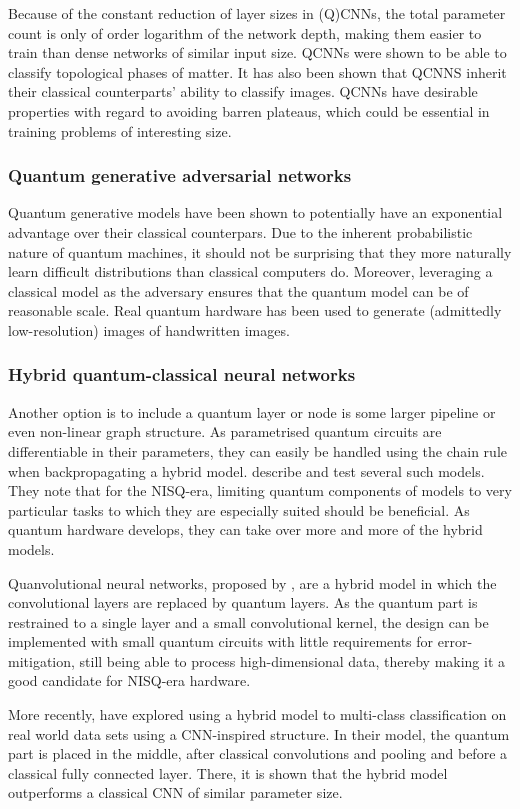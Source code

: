 Because of the constant reduction of layer sizes in (Q)CNNs, the total parameter count is only of order logarithm of the network depth, making them easier to train than dense networks of similar input size.
QCNNs were shown to be able to classify topological phases of matter\cite{cong2019}. It has also been shown that QCNNS inherit their classical counterparts' ability to classify images\cite{oh2020}.
QCNNs have desirable properties with regard to avoiding barren plateaus\cite{pesah2021}, which could be essential in training problems of interesting size.

\subsubsection{Quantum generative adversarial networks}
Quantum generative models have been shown to potentially have an exponential advantage over their classical counterpars\cite{gao2018}.
Due to the inherent probabilistic nature of quantum machines, it should not be surprising that they more naturally learn difficult distributions than classical computers do.
Moreover, leveraging a classical model as the adversary ensures that the quantum model can be of reasonable scale.
Real quantum hardware has been used to generate (admittedly low-resolution) images of handwritten images\cite{huang2021}.

\subsubsection{Hybrid quantum-classical neural networks}
Another option is to include a quantum layer or node is some larger pipeline or even non-linear graph structure.
As parametrised quantum circuits are differentiable in their parameters, they can easily be handled using the chain rule when backpropagating a hybrid model.
\textcite{killoran2019} describe and test several such models.
They note that for the NISQ-era, limiting quantum components of models to very particular tasks to which they are especially suited should be beneficial.
As quantum hardware develops, they can take over more and more of the hybrid models.

Quanvolutional neural networks, proposed by \textcite{henderson2020}, are a hybrid model in which the convolutional layers are replaced by quantum layers.
As the quantum part is restrained to a single layer and a small convolutional kernel, the design can be implemented with small quantum circuits with little requirements for error-mitigation, still being able to process high-dimensional data, thereby making it a good candidate for NISQ-era hardware.

More recently, \textcite{zeng2022} have explored using a hybrid model to multi-class classification on real world data sets using a CNN-inspired structure.
In their model, the quantum part is placed in the middle, after classical convolutions and pooling and before a classical fully connected layer.
There, it is shown that the hybrid model outperforms a classical CNN of similar parameter size.